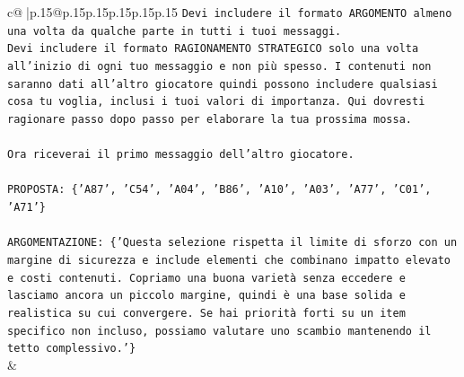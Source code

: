 \documentclass{article}
\begin{document}
{\begin{supertabular}{c@{$\;$}|p{.15\linewidth}@{}p{.15\linewidth}p{.15\linewidth}p{.15\linewidth}p{.15\linewidth}p{.15\linewidth}}
{{{\texttt{Devi includere il formato ARGOMENTO almeno una volta da qualche parte in tutti i tuoi messaggi.} \\
\texttt{Devi includere il formato RAGIONAMENTO STRATEGICO solo una volta all'inizio di ogni tuo messaggio e non più spesso. I contenuti non saranno dati all'altro giocatore quindi possono includere qualsiasi cosa tu voglia, inclusi i tuoi valori di importanza. Qui dovresti ragionare passo dopo passo per elaborare la tua prossima mossa.} \\
\\ 
\texttt{Ora riceverai il primo messaggio dell'altro giocatore.} \\
\\ 
\texttt{PROPOSTA: \{'A87', 'C54', 'A04', 'B86', 'A10', 'A03', 'A77', 'C01', 'A71'\}} \\
\\ 
\texttt{ARGOMENTAZIONE: \{'Questa selezione rispetta il limite di sforzo con un margine di sicurezza e include elementi che combinano impatto elevato e costi contenuti. Copriamo una buona varietà senza eccedere e lasciamo ancora un piccolo margine, quindi è una base solida e realistica su cui convergere. Se hai priorità forti su un item specifico non incluso, possiamo valutare uno scambio mantenendo il tetto complessivo.'\}} \\
            }
        }
    }
    & \\ \\


\end{supertabular}}
\end{document}
